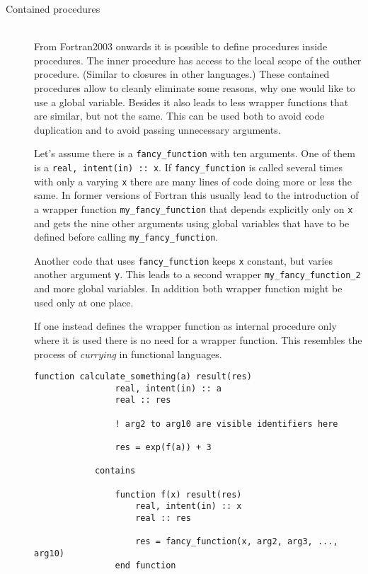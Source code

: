 \documentclass[a4paper,notitlepage,dvipsnames]{scrreprt}
\newcommand\headitem[1]{\needspace{1.5\baselineskip}\item[{\boldmath #1 \nopagebreak}] \hfill \\ \nopagebreak}
\let\code\lstinline
\begin{document}
\begin{description}
    \headitem{Contained procedures}
        From Fortran2003 onwards it is possible to define procedures
        inside procedures.
        The inner procedure has access to the local scope of
        the outher procedure.
        (Similar to closures in other languages.)
        These contained procedures allow to cleanly eliminate some reasons,
        why one would like to use a global variable.
        Besides it also leads to less wrapper functions that are similar,
        but not the same. This can be used both to avoid code duplication and
        to avoid passing unnecessary arguments.

        Let's assume there is a \code{fancy_function} with ten arguments.
        One of them is a \code{real, intent(in) :: x}.
        If \code{fancy_function} is called several times with only
        a varying \code{x} there are many lines of code doing more or less
        the same.
        In former versions of Fortran this usually lead to the introduction
        of a wrapper function \code{my_fancy_function}
        that depends explicitly only on \code{x} and gets the nine other
        arguments using global variables that have to be defined before
        calling \code{my_fancy_function}.

        Another code that uses \code{fancy_function} keeps \code{x}
        constant, but varies another argument \code{y}.
        This leads to a second wrapper \code{my_fancy_function_2}
        and more global variables.
        In addition both wrapper function might be used only at one place.

        If one instead defines the wrapper function as internal procedure
        only where it is used there is no need for a wrapper function.
        This resembles the process of \emph{currying} in functional languages.

		\begin{lstlisting}[gobble=12]
            function calculate_something(a) result(res)
                real, intent(in) :: a
                real :: res

                ! arg2 to arg10 are visible identifiers here

                res = exp(f(a)) + 3

            contains

                function f(x) result(res)
                    real, intent(in) :: x
                    real :: res

                    res = fancy_function(x, arg2, arg3, ..., arg10)
                end function


\end{lstlisting}
\end{description}
\end{document}
